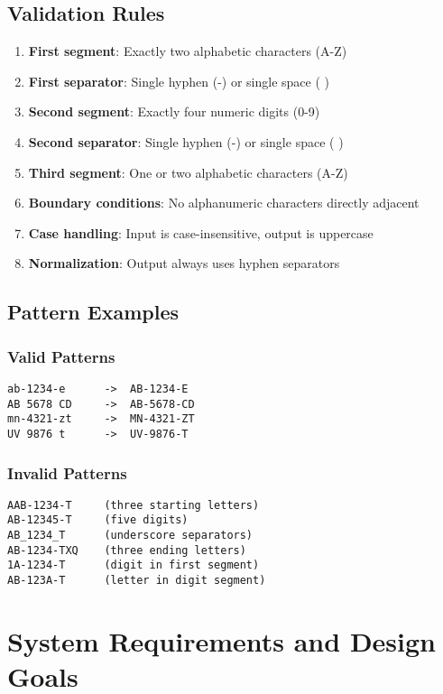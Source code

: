 \documentclass[12pt,a4paper]{article}
\begin{document}
\subsection{Validation Rules}
\begin{enumerate}
    \item \textbf{First segment}: Exactly two alphabetic characters (A-Z)
    \item \textbf{First separator}: Single hyphen (-) or single space ( )
    \item \textbf{Second segment}: Exactly four numeric digits (0-9)
    \item \textbf{Second separator}: Single hyphen (-) or single space ( )
    \item \textbf{Third segment}: One or two alphabetic characters (A-Z)
    \item \textbf{Boundary conditions}: No alphanumeric characters directly adjacent
    \item \textbf{Case handling}: Input is case-insensitive, output is uppercase
    \item \textbf{Normalization}: Output always uses hyphen separators
\end{enumerate}

\subsection{Pattern Examples}
\subsubsection{Valid Patterns}
\begin{lstlisting}[frame=single, backgroundcolor=\color{green!10}]
ab-1234-e      ->  AB-1234-E
AB 5678 CD     ->  AB-5678-CD
mn-4321-zt     ->  MN-4321-ZT
UV 9876 t      ->  UV-9876-T
\end{lstlisting}

\subsubsection{Invalid Patterns}
\begin{lstlisting}[frame=single, backgroundcolor=\color{red!10}]
AAB-1234-T     (three starting letters)
AB-12345-T     (five digits)
AB_1234_T      (underscore separators)
AB-1234-TXQ    (three ending letters)
1A-1234-T      (digit in first segment)
AB-123A-T      (letter in digit segment)
\end{lstlisting}

\section{System Requirements and Design Goals}
\end{document}
